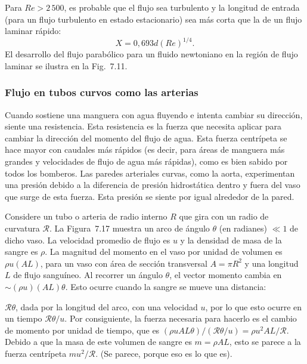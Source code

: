 \documentclass[12pt]{book}
\begin{document}
Para $Re > 2\,500$, es probable que el flujo sea turbulento y la longitud de entrada (para un flujo turbulento en estado estacionario) sea más corta que la de un flujo laminar rápido:
\begin{equation}
X = 0{,}693 d (Re)^{1/4}.
\label{eq:756}
\end{equation}
El desarrollo del flujo parabólico para un fluido newtoniano en la región de flujo laminar se ilustra en la Fig.~7.11.

\subsubsection*{Flujo en tubos curvos como las arterias}

Cuando sostiene una manguera con agua fluyendo e intenta cambiar su dirección, siente una resistencia. Esta resistencia es la fuerza que necesita aplicar para cambiar la dirección del momento del flujo de agua. Esta fuerza centrípeta se hace mayor con caudales más rápidos (es decir, para áreas de manguera más grandes y velocidades de flujo de agua más rápidas), como es bien sabido por todos los bomberos. Las paredes arteriales curvas, como la aorta, experimentan una presión debido a la diferencia de presión hidrostática dentro y fuera del vaso que surge de esta fuerza. Esta presión se siente por igual alrededor de la pared.

Considere un tubo o arteria de radio interno $R$ que gira con un radio de curvatura $\mathcal{R}$. La Figura~7.17 muestra un arco de ángulo $\theta$ (en radianes) $\ll 1$ de dicho vaso. La velocidad promedio de flujo es $u$ y la densidad de masa de la sangre es $\rho$. La magnitud del momento en el vaso por unidad de volumen es $\rho u (AL)$, para un vaso con área de sección transversal $A = \pi R^2$ y una longitud $L$ de flujo sanguíneo. Al recorrer un ángulo $\theta$, el vector momento cambia en ${\sim}(\rho u)(AL)\theta$. Esto ocurre cuando la sangre se mueve una distancia:

$\mathcal{R}\theta$, dada por la longitud del arco, con una velocidad $u$, por lo que esto ocurre en un tiempo $\mathcal{R}\theta/u$. Por consiguiente, la fuerza necesaria para hacerlo es el cambio de momento por unidad de tiempo, que es $(\rho u A L \theta) / (\mathcal{R}\theta/u) = \rho u^2 A L/\mathcal{R}$. Debido a que la masa de este volumen de sangre es $m = \rho AL$, esto se parece a la fuerza centrípeta $m u^2/\mathcal{R}$. (Se parece, porque eso es lo que es).
\end{document}
